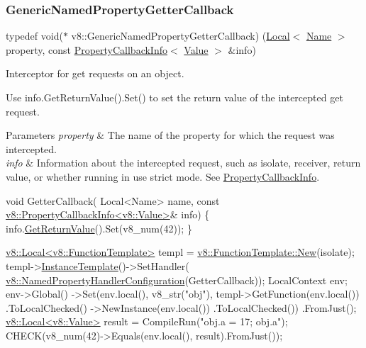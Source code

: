 \subsubsection{\texorpdfstring{Generic\+Named\+Property\+Getter\+Callback}{GenericNamedPropertyGetterCallback}}
{\footnotesize\ttfamily typedef void($\ast$ v8\+::\+Generic\+Named\+Property\+Getter\+Callback) (\mbox{\hyperlink{classv8_1_1Local}{Local}}$<$ \mbox{\hyperlink{classv8_1_1Name}{Name}} $>$ property, const \mbox{\hyperlink{classv8_1_1PropertyCallbackInfo}{Property\+Callback\+Info}}$<$ \mbox{\hyperlink{classv8_1_1Value}{Value}} $>$ \&info)}

Interceptor for get requests on an object.

Use {\ttfamily info.\+Get\+Return\+Value().Set()} to set the return value of the intercepted get request.


\begin{DoxyParams}{Parameters}
{\em property} & The name of the property for which the request was intercepted. \\
\hline
{\em info} & Information about the intercepted request, such as isolate, receiver, return value, or whether running in {\ttfamily \textquotesingle{}use strict}\textquotesingle{} mode. See {\ttfamily \mbox{\hyperlink{classv8_1_1PropertyCallbackInfo}{Property\+Callback\+Info}}}.\\
\hline
\end{DoxyParams}

\begin{DoxyCode}
\textcolor{keywordtype}{void} GetterCallback(
  Local<Name> name,
  \textcolor{keyword}{const} \mbox{\hyperlink{classv8_1_1PropertyCallbackInfo}{v8::PropertyCallbackInfo<v8::Value>}}& info) \{
    info.\mbox{\hyperlink{classv8_1_1PropertyCallbackInfo_aa0882946929c3c4df6d131fe0d8d6746}{GetReturnValue}}().Set(v8\_num(42));
\}

\mbox{\hyperlink{classv8_1_1Local}{v8::Local<v8::FunctionTemplate>}} templ =
    \mbox{\hyperlink{classv8_1_1FunctionTemplate_a3b675b8327f08a7c6a4c4d9dce5cb3b3}{v8::FunctionTemplate::New}}(isolate);
templ->\mbox{\hyperlink{classv8_1_1FunctionTemplate_a00dd9725566908e8fd14064542f5a781}{InstanceTemplate}}()->SetHandler(
    \mbox{\hyperlink{structv8_1_1NamedPropertyHandlerConfiguration}{v8::NamedPropertyHandlerConfiguration}}(GetterCallback));
LocalContext env;
env->Global()
    ->Set(env.local(), v8\_str(\textcolor{stringliteral}{"obj"}), templ->GetFunction(env.local())
                                           .ToLocalChecked()
                                           ->NewInstance(env.local())
                                           .ToLocalChecked())
    .FromJust();
\mbox{\hyperlink{classv8_1_1Local}{v8::Local<v8::Value>}} result = CompileRun(\textcolor{stringliteral}{"obj.a = 17; obj.a"});
CHECK(v8\_num(42)->Equals(env.local(), result).FromJust());
\end{DoxyCode}


